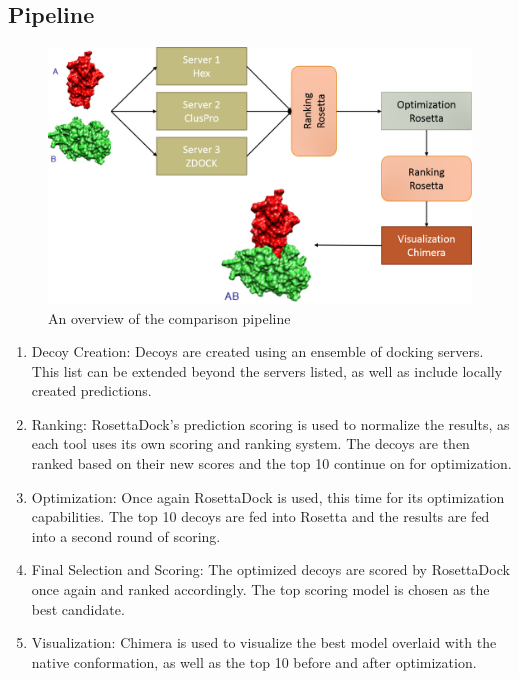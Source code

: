\documentclass{article}
\begin{document}
\subsection{Pipeline}

\begin{figure}[H]
\begin{center}
\includegraphics[width=\textwidth]{pipeline}
\caption{An overview of the comparison pipeline}
\label{Fig:blosum}
\end{center}
\end{figure}

\begin{enumerate}
\item Decoy Creation:
Decoys are created using an ensemble of docking servers. This list can be extended beyond the servers listed, as well as include locally created predictions.

\item Ranking:
RosettaDock's prediction scoring is used to normalize the results, as each tool uses its own scoring and ranking system. The decoys are then ranked based on their new scores and the top 10 continue on for optimization.

\item Optimization:
Once again RosettaDock is used, this time for its optimization capabilities. The top 10 decoys are fed into Rosetta and the results are fed into a second round of scoring.

\item Final Selection and Scoring:
The optimized decoys are scored by RosettaDock once again and ranked accordingly. The top scoring model is chosen as the best candidate.

\item Visualization:
Chimera is used to visualize the best model overlaid with the native conformation, as well as the top 10 before and after optimization.
\end{enumerate}
\end{document}
